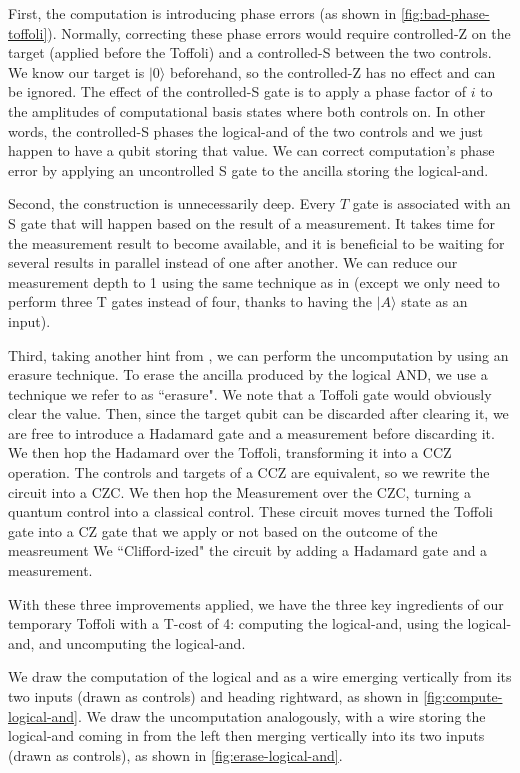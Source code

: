 \documentclass[twocolumn,longbibliography]{quantumarticle-customized}
\begin{document}
First, the computation is introducing phase errors (as shown in \autoref{fig:bad-phase-toffoli}).
Normally, correcting these phase errors would require controlled-Z on the target (applied before the Toffoli) and a controlled-S between the two controls.
We know our target is $|0\rangle$ beforehand, so the controlled-Z has no effect and can be ignored.
The effect of the controlled-S gate is to apply a phase factor of $i$ to the amplitudes of computational basis states where both controls on.
In other words, the controlled-S phases the logical-and of the two controls and we just happen to have a qubit storing that value.
We can correct computation's phase error by applying an uncontrolled S gate to the ancilla storing the logical-and.

Second, the construction is unnecessarily deep.
Every $T$ gate is associated with an S gate that will happen based on the result of a measurement.
It takes time for the measurement result to become available, and it is beneficial to be waiting for several results in parallel instead of one after another.
We can reduce our measurement depth to 1 using the same technique as in \cite{Jones2013} (except we only need to perform three T gates instead of four, thanks to having the $|A\rangle$ state as an input).

Third, taking another hint from \cite{Jones2013}, we can perform the uncomputation by using an erasure technique.
To erase the ancilla produced by the logical AND, we use a technique we refer to as ``erasure".
We note that a Toffoli gate would obviously clear the value.
Then, since the target qubit can be discarded after clearing it, we are free to introduce a Hadamard gate and a measurement before discarding it.
We then hop the Hadamard over the Toffoli, transforming it into a CCZ operation.
The controls and targets of a CCZ are equivalent, so we rewrite the circuit into a CZC.
We then hop the Measurement over the CZC, turning a quantum control into a classical control.
These circuit moves turned the Toffoli gate into a CZ gate that we apply or not based on the outcome of the measreument
We ``Clifford-ized" the circuit by adding a Hadamard gate and a measurement.

With these three improvements applied, we have the three key ingredients of our temporary Toffoli with a T-cost of 4: computing the logical-and, using the logical-and, and uncomputing the logical-and.

We draw the computation of the logical and as a wire emerging vertically from its two inputs (drawn as controls) and heading rightward, as shown in \autoref{fig:compute-logical-and}.
We draw the uncomputation analogously, with a wire storing the logical-and coming in from the left then merging vertically into its two inputs (drawn as controls), as shown in \autoref{fig:erase-logical-and}.
\end{document}
